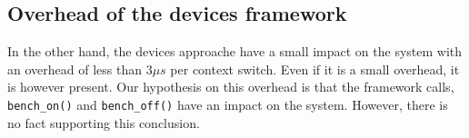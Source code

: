 \subsection{Overhead of the devices framework}

In the other hand, the devices approache have a small impact on the system with an overhead of less than $3\mu s$ per context switch.
Even if it is a small overhead, it is however present.
Our hypothesis on this overhead is that the framework calls, \texttt{bench\_on()} and \texttt{bench\_off()} have an impact on the system.
However, there is no fact supporting this conclusion.